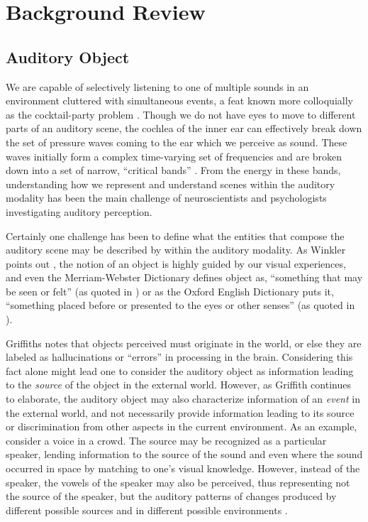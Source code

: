 \documentclass[a4paper,10pt,final]{ThesisStyle}
\begin{document}
\section{Background Review}

\subsection{Auditory Object}

We are capable of selectively listening to one of multiple sounds in an environment cluttered with simultaneous events, a feat known more colloquially as the cocktail-party problem \cite{McDermott2009}.  Though we do not have eyes to move to different parts of an auditory scene, the cochlea of the inner ear can effectively break down the set of pressure waves coming to the ear which we perceive as sound.  These waves initially form a complex time-varying set of frequencies and are broken down into a set of narrow, ``critical bands'' \cite{Fletcher1940}.  From the energy in these bands, understanding how we represent and understand scenes within the auditory modality has been the main challenge of neuroscientists and psychologists investigating auditory perception.  

Certainly one challenge has been to define what the entities that compose the auditory scene may be described by within the auditory modality.  As Winkler points out \cite{Ist2010}, the notion of an object is highly guided by our visual experiences, and even the Merriam-Webster Dictionary defines object as, ``something that may be seen or felt'' (as quoted in \cite{Ist2010}) or as the Oxford English Dictionary puts it, ``something placed before or presented to the eyes or other senses'' (as quoted in \cite{Griffiths2004}).  

Griffiths notes that objects perceived must originate in the world, or else they are labeled as hallucinations or ``errors'' in processing in the brain.  Considering this fact alone might lead one to consider the auditory object as information leading to the \textit{source} of the object in the external world.  However, as Griffith continues to elaborate, the auditory object may also characterize information of an \textit{event} in the external world, and not necessarily provide information leading to its source or discrimination from other aspects in the current environment.  As an example, consider a voice in a crowd.  The source may be recognized as a particular speaker, lending information to the source of the sound and even where the sound occurred in space by matching to one's visual knowledge.  However, instead of the speaker, the vowels of the speaker may also be perceived, thus representing not the source of the speaker, but the auditory patterns of changes produced by different possible sources and in different possible environments \cite{Griffiths2004}.  
\end{document}
